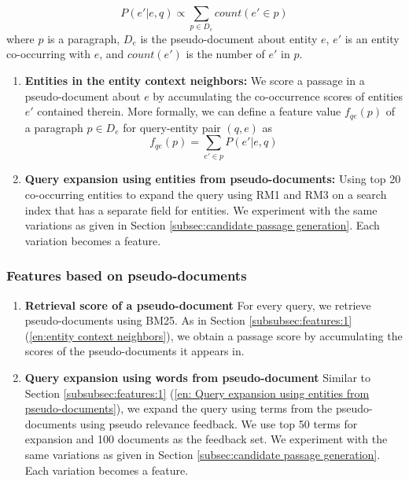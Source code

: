 \documentclass[sigconf,anonymous,review]{acmart}
\begin{document}
\begin{equation}
\label{eq:1}
    P(e'|e,q) \propto \sum_{p \in D_e} count(e'\in p)
\end{equation}
where $p$ is a paragraph, $D_e$ is the pseudo-document about entity $e$, $e'$ is an entity co-occurring with $e$, and $count(e')$ is the number of $e'$ in $p$. 
\begin{enumerate}
    \item \textbf{Entities in the entity context neighbors:} \label{en:entity context neighbors} We score a passage in a pseudo-document about $e$ by accumulating the co-occurrence scores of entities $e'$ contained therein. 
More formally, we can define a feature value $f_{qe}(p)$ of a paragraph $p \in D_e$ for query-entity pair $(q, e)$ as
\begin{equation}
\label{eq:2}
    f_{qe}(p) = \sum_{e' \in p} P(e'|e,q)
\end{equation}
\item \textbf{Query expansion using entities from pseudo-documents:} \label{en: Query expansion using entities from pseudo-documents} Using top 20 co-occurring entities to expand the query using RM1 and RM3 on a search index that has a separate field for entities. We experiment with the same variations as given in Section \ref{subsec:candidate passage generation}. Each variation becomes a feature.
\end{enumerate}
\subsubsection{Features based on pseudo-documents}
\label{subsubsec:feature:2}
\begin{enumerate}
    \item \textbf{Retrieval score of a pseudo-document} \label{en:Retrieval score of a pseudo-document}For every query, we retrieve pseudo-documents using BM25. As in Section \ref{subsubsec:features:1} (\ref{en:entity context neighbors}), we obtain a passage score by accumulating the scores of the pseudo-documents it appears in. 

    \item \textbf{Query expansion using words from pseudo-document} \label{en:Query expansion using words from pseudo-document} Similar to Section \ref{subsubsec:features:1} (\ref{en: Query expansion using entities from pseudo-documents}), we expand the query using terms from the pseudo-documents using pseudo relevance feedback. We use top 50 terms for expansion and 100 documents as the feedback set. We experiment with the same variations as given in Section \ref{subsec:candidate passage generation}. Each variation becomes a feature.
\end{enumerate}
\end{document}
